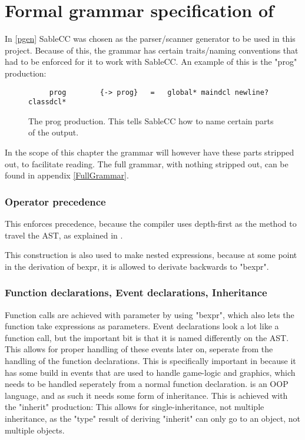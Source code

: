 \section {Formal grammar specification of \lang{}}
In \ref{pgen} SableCC was chosen as the parser/scanner generator to be used in this project. Because of this, the grammar has certain traits/naming conventions that had to be enforced for it to work with SableCC. An example of this is the "prog" production:

\begin{figure}[H]
  \centering
    \begin{lstlisting}
     prog        {-> prog}   =   global* maindcl newline? classdcl*
    \end{lstlisting}
  \caption{The prog production. This tells SableCC how to name certain parts of the output.}
  \label{fig:prog}
\end{figure}

In the scope of this chapter the grammar will however have these parts stripped out, to facilitate reading. The full grammar, with nothing stripped out, can be found in appendix \ref{FullGrammar}. 


\subsubsection{Operator precedence}
This enforces precedence, because the compiler uses depth-first as the method to travel the AST, as explained in .  



This construction is also used to make nested expressions, because at some point in the derivation of bexpr, it is allowed to derivate backwards to "bexpr".

\subsubsection{Function declarations, Event declarations, Inheritance}
Function calls are achieved with parameter by using "bexpr", which also lets the function take expressions as parameters. Event declarations look a lot like a function call, but the important bit is that it is named differently on the AST. This allows for proper handling of these events later on, seperate from the handling of the function declarations. This is specifically important in \lang{} because it has some build in events that are used to handle game-logic and graphics, which needs to be handled seperately from a normal function declaration.
\lang{} is an OOP language, and as such it needs some form of inheritance. This is achieved with the "inherit" production:
This allows for single-inheritance, not multiple inheritance, as the "type" result of deriving "inherit" can only go to an object, not multiple objects.





